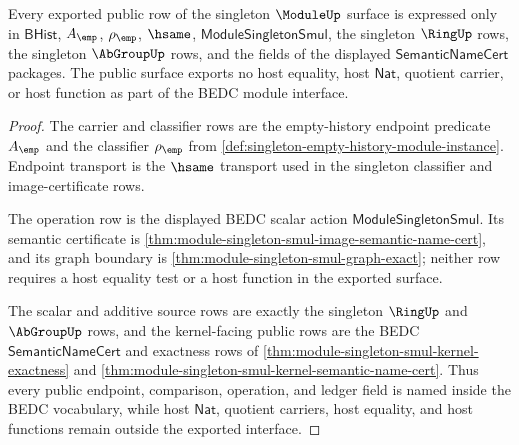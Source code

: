 \begin{theorem}
\label{thm:module-singleton-no-host-leak}
Every exported public row of the singleton $\ModuleUp$ surface is expressed
only in $\mathsf{BHist}$, $A_{\emp}$, $\rho_{\emp}$, $\hsame$,
$\mathsf{ModuleSingletonSmul}$, the singleton $\RingUp$ rows, the singleton
$\AbGroupUp$ rows, and the fields of the displayed
$\mathsf{SemanticNameCert}$ packages. The public surface exports no host
equality, host $\mathsf{Nat}$, quotient carrier, or host function as part of
the BEDC module interface.
\end{theorem}
\begin{proof}
The carrier and classifier rows are the empty-history endpoint predicate
$A_{\emp}$ and the classifier $\rho_{\emp}$ from
\autoref{def:singleton-empty-history-module-instance}. Endpoint transport is
the $\hsame$ transport used in the singleton classifier and image-certificate
rows.

The operation row is the displayed BEDC scalar action
$\mathsf{ModuleSingletonSmul}$. Its semantic certificate is
\autoref{thm:module-singleton-smul-image-semantic-name-cert}, and its graph
boundary is \autoref{thm:module-singleton-smul-graph-exact}; neither row
requires a host equality test or a host function in the exported surface.

The scalar and additive source rows are exactly the singleton $\RingUp$ and
$\AbGroupUp$ rows, and the kernel-facing public rows are the BEDC
$\mathsf{SemanticNameCert}$ and exactness rows of
\autoref{thm:module-singleton-smul-kernel-exactness} and
\autoref{thm:module-singleton-smul-kernel-semantic-name-cert}. Thus every
public endpoint, comparison, operation, and ledger field is named inside the
BEDC vocabulary, while host $\mathsf{Nat}$, quotient carriers, host equality,
and host functions remain outside the exported interface.
\end{proof}

